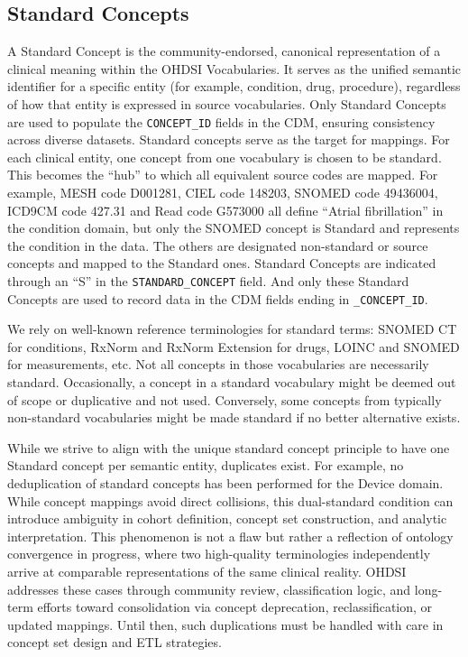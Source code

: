 \documentclass[
  letterpaper,
  paper=7in:10in,
  pagesize=pdftex,
  headinclude=on,
  footinclude=on,
  12pt]{scrbook}
\begin{document}
\subsection{Standard Concepts}\label{standard-concepts}

A Standard Concept is the community-endorsed, canonical representation
of a clinical meaning within the OHDSI Vocabularies. It serves as the
unified semantic identifier for a specific entity (for example,
condition, drug, procedure), regardless of how that entity is expressed
in source vocabularies. Only Standard Concepts are used to populate the
\texttt{CONCEPT\_ID} fields in the CDM, ensuring consistency across
diverse datasets. Standard concepts serve as the target for mappings.
For each clinical entity, one concept from one vocabulary is chosen to
be standard. This becomes the ``hub'' to which all equivalent source
codes are mapped. For example, MESH code D001281, CIEL code 148203,
SNOMED code 49436004, ICD9CM code 427.31 and Read code G573000 all
define ``Atrial fibrillation'' in the condition domain, but only the
SNOMED concept is Standard and represents the condition in the data. The
others are designated non-standard or source concepts and mapped to the
Standard ones. Standard Concepts are indicated through an ``S'' in the
\texttt{STANDARD\_CONCEPT} field. And only these Standard Concepts are
used to record data in the CDM fields ending in \texttt{\_CONCEPT\_ID}.

We rely on well-known reference terminologies for standard terms: SNOMED
CT for conditions, RxNorm and RxNorm Extension for drugs, LOINC and
SNOMED for measurements, etc. Not all concepts in those vocabularies are
necessarily standard. Occasionally, a concept in a standard vocabulary
might be deemed out of scope or duplicative and not used. Conversely,
some concepts from typically non-standard vocabularies might be made
standard if no better alternative exists.

While we strive to align with the unique standard concept principle to
have one Standard concept per semantic entity, duplicates exist. For
example, no deduplication of standard concepts has been performed for
the Device domain. While concept mappings avoid direct collisions, this
dual-standard condition can introduce ambiguity in cohort definition,
concept set construction, and analytic interpretation. This phenomenon
is not a flaw but rather a reflection of ontology convergence in
progress, where two high-quality terminologies independently arrive at
comparable representations of the same clinical reality. OHDSI addresses
these cases through community review, classification logic, and
long-term efforts toward consolidation via concept deprecation,
reclassification, or updated mappings. Until then, such duplications
must be handled with care in concept set design and ETL strategies.
\end{document}
